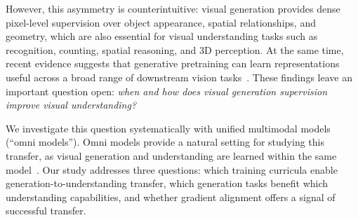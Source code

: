 However, this asymmetry is counterintuitive: visual generation provides dense pixel-level supervision over object appearance, spatial relationships, and geometry, which are also essential for visual understanding tasks such as recognition, counting, spatial reasoning, and 3D perception.
At the same time, recent evidence suggests that generative pretraining can learn representations useful across a broad range of downstream vision tasks~\citep{visionbanana2026}.
These findings leave an important question open: \textit{when and how does visual generation supervision improve visual understanding?}

We investigate this question systematically with unified multimodal models (``omni models''). 
Omni models provide a natural setting for studying this transfer, as visual generation and understanding are learned within the same model~\citep{metaqueries,wu2025harmonizing,bagel}.
Our study addresses three questions:
which training curricula enable generation-to-understanding transfer,
which generation tasks benefit which understanding capabilities,
and whether gradient alignment offers a signal of successful transfer.




